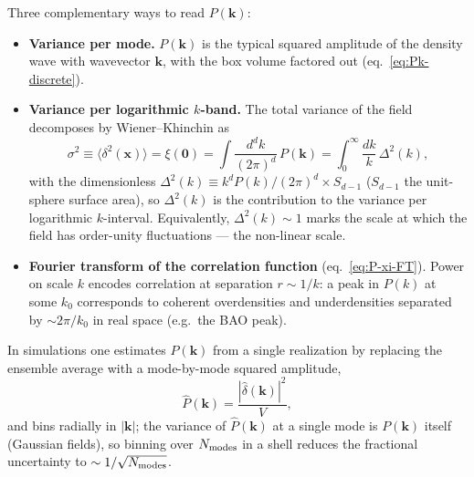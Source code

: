 \documentclass[12pt]{article}
\begin{document}
Three complementary ways to read $P(\mathbf k)$:
\begin{itemize}
\item \textbf{Variance per mode.} $P(\mathbf k)$ is the typical
squared amplitude of the density wave with wavevector $\mathbf k$,
with the box volume factored out (eq.~\ref{eq:Pk-discrete}).

\item \textbf{Variance per logarithmic $k$-band.} The total variance
of the field decomposes by Wiener--Khinchin as
\begin{equation*}
  \sigma^2 \equiv \langle\delta^2(\mathbf x)\rangle
   = \xi(\mathbf 0)
   = \int\frac{d^dk}{(2\pi)^d}\,P(\mathbf k)
   = \int_0^\infty\frac{dk}{k}\,\Delta^2(k),
\end{equation*}
with the dimensionless $\Delta^2(k)\equiv k^d
P(k)/(2\pi)^d \times S_{d-1}$ ($S_{d-1}$ the unit-sphere surface
area), so $\Delta^2(k)$ is the contribution to the variance per
logarithmic $k$-interval. Equivalently, $\Delta^2(k)\sim 1$ marks
the scale at which the field has order-unity fluctuations --- the
non-linear scale.

\item \textbf{Fourier transform of the correlation function} (eq.\
\ref{eq:P-xi-FT}). Power on scale $k$ encodes correlation at
separation $r\sim 1/k$: a peak in $P(k)$ at some $k_0$ corresponds
to coherent overdensities and underdensities separated by $\sim
2\pi/k_0$ in real space (e.g.\ the BAO peak).
\end{itemize}

In simulations one estimates $P(\mathbf k)$ from a single realization
by replacing the ensemble average with a mode-by-mode squared
amplitude,
\begin{equation*}
  \widehat P(\mathbf k) = \frac{|\hat\delta(\mathbf k)|^2}{V},
\end{equation*}
and bins radially in $|\mathbf k|$; the variance of $\widehat
P(\mathbf k)$ at a single mode is $P(\mathbf k)$ itself (Gaussian
fields), so binning over $N_{\rm modes}$ in a shell reduces the
fractional uncertainty to $\sim 1/\sqrt{N_{\rm modes}}$.


\end{document}
